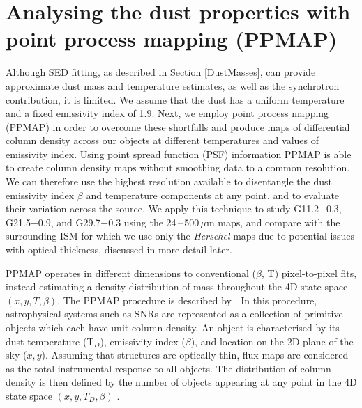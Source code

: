 \documentclass[fleqn,usenatbib]{mnras}
\begin{document}
{%
\section{Analysing the dust properties with point process mapping (PPMAP)} \label{ppmap}
Although SED fitting, as described in Section \ref{DustMasses}, can provide approximate dust mass and temperature estimates, as well as the synchrotron contribution, it is limited. We assume that the dust has a uniform temperature and a fixed emissivity index of 1.9. %
Next, we employ point process mapping (PPMAP) \citep{Marsh2015, Marsh2017} in order to overcome these shortfalls and produce maps of differential column density across our objects at different temperatures and values of emissivity index.
Using point spread function (PSF) information PPMAP is able to create column density maps without smoothing data to a common resolution. We can therefore use the highest resolution available to disentangle the dust emissivity index $\beta$ and temperature components at any point, and to evaluate their variation across the source.
We apply this technique to study G11.2$-$0.3, G21.5$-$0.9, and G29.7$-$0.3 using the 24\,--\,500\,$\mu$m maps, and compare with the surrounding ISM for which we use only the \textit{Herschel} maps due to potential issues with optical thickness, discussed in more detail later.

PPMAP operates in different dimensions to conventional ($\beta$, T) pixel-to-pixel fits, instead estimating a density distribution of mass throughout the 4D state space $(x, y, T, \beta)$.
The PPMAP procedure is described by \citet{Marsh2015}. In this procedure, astrophysical systems such as SNRs are represented as a collection of primitive objects which each have unit column density.  An object is characterised by its dust temperature (T$_D$), emissivity index ($\beta$), and location on the 2D plane of the sky ($x, y$). %
Assuming that structures are optically thin, flux maps are considered as the total instrumental response to all objects. The distribution of column density is then defined by the number of objects appearing at any point in the 4D state space $(x, y, T_D, \beta)$ . %

}
\end{document}
